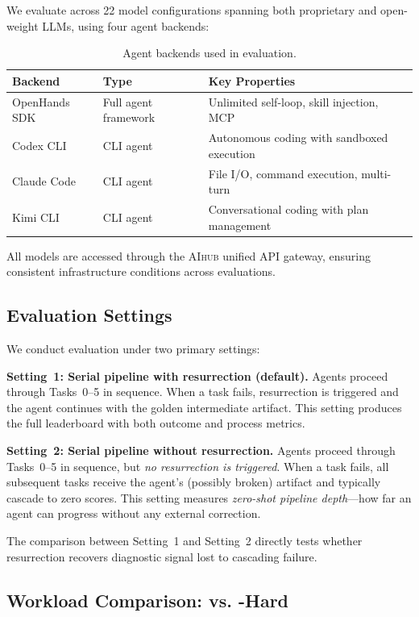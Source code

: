 We evaluate \eva{} across 22 model configurations spanning both proprietary and open-weight LLMs, using four agent backends:

\begin{table}[!t]
\centering
\small
\begin{tabular}{lll}
\toprule
\textbf{Backend} & \textbf{Type} & \textbf{Key Properties} \\
\midrule
OpenHands SDK & Full agent framework & Unlimited self-loop, skill injection, MCP \\
Codex CLI & CLI agent & Autonomous coding with sandboxed execution \\
Claude Code & CLI agent & File I/O, command execution, multi-turn \\
Kimi CLI & CLI agent & Conversational coding with plan management \\
\bottomrule
\end{tabular}
\caption{Agent backends used in \eva{} evaluation.}
\label{tab:backends}
\end{table}

All models are accessed through the \textsc{AIhub} unified API gateway, ensuring consistent infrastructure conditions across evaluations.

\subsection{Evaluation Settings}

We conduct evaluation under two primary settings:

\textbf{Setting~1: Serial pipeline with resurrection (default).}
Agents proceed through Tasks~0--5 in sequence.
When a task fails, resurrection is triggered and the agent continues with the golden intermediate artifact.
This setting produces the full leaderboard with both outcome and process metrics.

\textbf{Setting~2: Serial pipeline without resurrection.}
Agents proceed through Tasks~0--5 in sequence, but \emph{no resurrection is triggered}.
When a task fails, all subsequent tasks receive the agent's (possibly broken) artifact and typically cascade to zero scores.
This setting measures \emph{zero-shot pipeline depth}---how far an agent can progress without any external correction.

The comparison between Setting~1 and Setting~2 directly tests whether resurrection recovers diagnostic signal lost to cascading failure.

\subsection{Workload Comparison: \yatcc{} vs. \yatcc{}-Hard}

